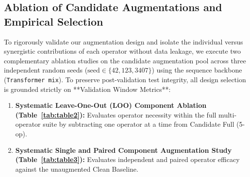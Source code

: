 \documentclass[runningheads]{llncs}
\begin{document}
\begin{table}[!t]
\centering
\caption{Systematic comparison of temporal sequential backbones across metric World 3D (39-d) and Biomechanical Mix v2 (63-d) representations on the validation partition ($N=2,075$ windows). Reported as $\text{Mean} \pm \text{SD}$ across 3 independent random seeds ($42, 123, 3407$).}
\label{tab:table1}
\end{table}

\subsection{Ablation of Candidate Augmentations and Empirical Selection}\label{sec:exp_aug}
To rigorously validate our augmentation design and isolate the individual versus synergistic contributions of each operator without data leakage, we execute two complementary ablation studies on the candidate augmentation pool across three independent random seeds ($\text{seed} \in \{42, 123, 3407\}$) using the sequence backbone (\texttt{Transformer mix}). To preserve post-validation test integrity, all design selection is grounded strictly on **Validation Window Metrics**:
\begin{enumerate}
    \item \textbf{Systematic Leave-One-Out (LOO) Component Ablation (Table~\ref{tab:table2}):} Evaluates operator necessity within the full multi-operator suite by subtracting one operator at a time from Candidate Full (5-op).
    \item \textbf{Systematic Single and Paired Component Augmentation Study (Table~\ref{tab:table3}):} Evaluates independent and paired operator efficacy against the unaugmented Clean Baseline.
\end{enumerate}
\end{document}
